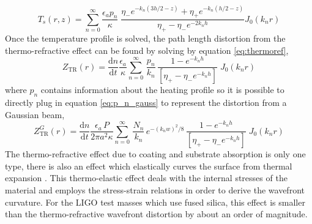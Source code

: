 	\begin{equation}
	T_s(r,z) = \sum_{n=0}^{\infty} \frac{\epsilon_a p_n}{\kappa}  \; \frac{ \eta_{-}e^{-k_n(3h/2-z)} + \eta_{+}e^{-k_n(h/2-z)}  }{\eta_{+} - \eta_{-} e^{-2k_n h} } J_0(k_n r)
	\end{equation} 
	Once the temperature profile is solved, the path length distortion from the thermo-refractive effect can be found by solving by equation \ref{eq:thermoref},
	\begin{equation}
	Z_{\text{TR}}(r) = \frac{\text{d}n}{\text{d}t} \frac{\epsilon_a}{\kappa} \sum_{n=0}^{\infty} \, \frac{p_n}{k_n} \, \frac{1- e^{-k_n h}}{[\eta_{+} - \eta_{-} e^{-k_nh}]} \; J_0(k_n r) 
	\end{equation}
	where $p_n$ contains information about the heating profile so it is possible to directly plug in equation \ref{eq:p_n_gauss} to represent the distortion from a Gaussian beam,
	\begin{equation}
	Z_{\text{TR}}^{G}(r) =  \frac{\text{d}n}{\text{d}t} \frac{\epsilon_a \, P}{2\pi a^2 \kappa} \sum_{n=0}^{\infty} \, \frac{N_n}{k_n}\, e^{-(k_n w)^2/8} \, \frac{1- e^{-k_n h}}{[\eta_{+} - \eta_{-} e^{-k_nh}]} \; J_0(k_n r) 
	\end{equation}
	The thermo-refractive effect due to coating and substrate absorption is only one type, there is also an effect which elastically curves the surface from thermal expansion \cite{Vinet_Thermal_Issues}.  This thermo-elastic effect deals with the internal stresses of the material and employs the stress-strain relations in order to derive the wavefront curvature.  For the LIGO test masses which use fused silica, this effect is smaller than the thermo-refractive wavefront distortion by about an order of magnitude.
	
